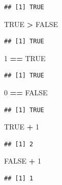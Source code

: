 \documentclass[]{book}
\newenvironment{Shaded}{\begin{snugshade}}{\end{snugshade}}
\newcommand{\DecValTok}[1]{\textcolor[rgb]{0.00,0.00,0.81}{#1}}
\newcommand{\StringTok}[1]{\textcolor[rgb]{0.31,0.60,0.02}{#1}}
\newcommand{\OtherTok}[1]{\textcolor[rgb]{0.56,0.35,0.01}{#1}}
\newcommand{\OperatorTok}[1]{\textcolor[rgb]{0.81,0.36,0.00}{\textbf{#1}}}
\begin{document}
\begin{verbatim}
## [1] TRUE
\end{verbatim}

\begin{Shaded}
\begin{Highlighting}[]
\OtherTok{TRUE} \OperatorTok{>}\StringTok{ }\OtherTok{FALSE}
\end{Highlighting}
\end{Shaded}

\begin{verbatim}
## [1] TRUE
\end{verbatim}

\begin{Shaded}
\begin{Highlighting}[]
\DecValTok{1} \OperatorTok{==}\StringTok{ }\OtherTok{TRUE}
\end{Highlighting}
\end{Shaded}

\begin{verbatim}
## [1] TRUE
\end{verbatim}

\begin{Shaded}
\begin{Highlighting}[]
\DecValTok{0} \OperatorTok{==}\StringTok{ }\OtherTok{FALSE}
\end{Highlighting}
\end{Shaded}

\begin{verbatim}
## [1] TRUE
\end{verbatim}

\begin{Shaded}
\begin{Highlighting}[]
\OtherTok{TRUE} \OperatorTok{+}\StringTok{ }\DecValTok{1}
\end{Highlighting}
\end{Shaded}

\begin{verbatim}
## [1] 2
\end{verbatim}

\begin{Shaded}
\begin{Highlighting}[]
\OtherTok{FALSE} \OperatorTok{+}\StringTok{ }\DecValTok{1}
\end{Highlighting}
\end{Shaded}

\begin{verbatim}
## [1] 1
\end{verbatim}
\end{document}
